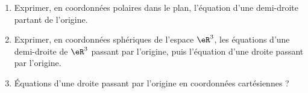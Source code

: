 
\begin{exercice}\label{exoOutilsMath-0085}

    \begin{enumerate}
        \item
            Exprimer, en coordonnées polaires dans le plan, l'équation d'une demi-droite partant de l'origine.
        \item
            Exprimer, en coordonnées sphériques de l'espace \( \eR^3\), les équations d'une demi-droite de \( \eR^3\) passant par l'origine, puis l'équation d'une droite passant par l'origine.
        \item
            Équations d'une droite passant par l'origine en coordonnées cartésiennes ?
    \end{enumerate}

\end{exercice}
